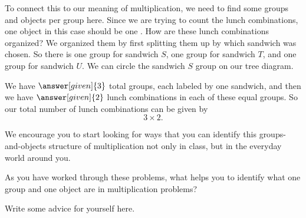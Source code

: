 \documentclass{ximera}
\begin{document}
\begin{example}
To connect this to our meaning of multiplication, we need to find some groups and objects per group here. Since we are trying to count the lunch combinations, one object in this case should be one . How are these lunch combinations organized? We organized them by first splitting them up by which sandwich was chosen. So there is one group for sandwich $S$, one group for sandwich $T$, and one group for sandwich $U$. We can circle the sandwich $S$ group on our tree diagram. 

\begin{image}
\end{image}

We have $\answer[given]{3}$ total groups, each labeled by one sandwich, and then we have $\answer[given]{2}$ lunch combinations in each of these equal groups. So our total number of lunch combinations can be given by 
\[
3 \times 2.
\]

\end{example}

We encourage you to start looking for ways that you can identify this groups-and-objects structure of multiplication not only in class, but in the everyday world around you.



\begin{question}
As you have worked through these problems, what helps you to identify what one group and one object are in multiplication problems?
\begin{freeResponse}
Write some advice for yourself here.
\end{freeResponse}
\end{question}
\end{document}
